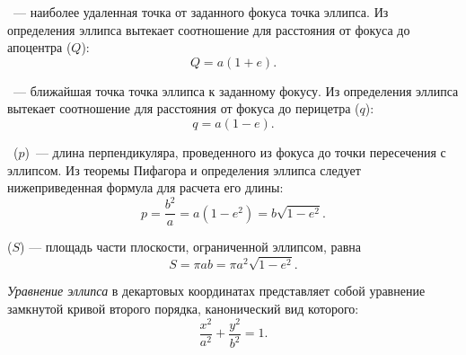 ~--- наиболее удаленная точка
от заданного фокуса точка эллипса. Из определения эллипса
вытекает соотношение для расстояния от фокуса до 
апоцентра ($Q$):\begin{equation}
Q = a (1 + e).
\end{equation}

~--- ближайшая точка
точка эллипса к заданному фокусу. Из определения эллипса
вытекает соотношение для расстояния от фокуса до 
перицетра ($q$):\begin{equation}
q = a (1 - e).
\end{equation}

~($p$)~--- длина перпендикуляра,
проведенного из фокуса до точки пересечения с эллипсом.
Из теоремы Пифагора и определения эллипса следует 
нижеприведенная формула для расчета его длины:
\begin{equation}
p=\frac{b^2}{a}=a(1-e^2)=b\sqrt{1-e^2}.
\end{equation}

 ($S$) --- площадь части 
плоскости, ограниченной эллипсом, равна
\begin{equation}
S=\pi ab = \pi a^2 \sqrt{1-e^2}.
\end{equation}


{\itshape Уравнение эллипса} в декартовых координатах 
представляет собой уравнение замкнутой кривой второго 
порядка, канонический вид которого:
\begin{equation}
\frac{x^2}{a^2}+\frac{y^2}{b^2}=1.
\end{equation}

